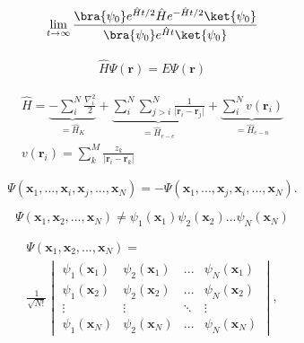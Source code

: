 \begin{equation}

\lim_{t\to\infty} \frac{\bra{\psi_0} e^{\hat{H}t/2} \hat{H} e^{-\hat{H}t/2} \ket{\psi_0}}{\bra{\psi_0} e^{\hat{H}t} \ket{\psi_0}}
\end{equation}

\begin{gather}

\hat{H} \Psi(\mathbf{r}) = E \Psi(\mathbf{r})
\end{gather}

\begin{gather}

\hat{H} = 
\underbrace{- \sum_i^N \frac{\nabla_i^2}{2}}_{=\hat{H}_K} 
+ \underbrace{\sum_i^N \sum_{j>i}^N \frac{1}{\vert\mathbf{r}_i-\mathbf{r}_j\vert}}_{=\hat{H}_{e-e}}
+ \underbrace{\sum_i^N v(\mathbf{r}_i)}_{=\hat{H}_{e-n}} \\
v(\mathbf{r}_i) = \sum_k^M \frac{z_k}{\vert\mathbf{r}_i-\mathbf{r}_k\vert}
\label{schroedinger_equation}
\end{gather}

\begin{equation}

\Psi(\mathbf{x}_1, ..., \mathbf{x}_i, \mathbf{x}_j, ..., \mathbf{x}_N) = 
-\Psi(\mathbf{x}_1, ..., \mathbf{x}_j, \mathbf{x}_i, ..., \mathbf{x}_N).
\end{equation}

\begin{equation}

\Psi(\mathbf{x}_1, \mathbf{x}_2, ..., \mathbf{x}_N) \neq \psi_1(\mathbf{x}_1) \psi_2(\mathbf{x}_2) ... \psi_N(\mathbf{x}_N)
\end{equation}

\begin{multline}

\Psi(\mathbf{x}_1, \mathbf{x}_2, ..., \mathbf{x}_N) =\\ 
\frac{1}{\sqrt{N!}}
\begin{vmatrix}
\psi_1(\mathbf{x}_1) & \psi_2(\mathbf{x}_1) & ... & \psi_N(\mathbf{x}_1) \\
\psi_1(\mathbf{x}_2) & \psi_2(\mathbf{x}_2) & ... & \psi_N(\mathbf{x}_2) \\
\vdots & \vdots & \ddots & \vdots \\
\psi_1(\mathbf{x}_N) & \psi_2(\mathbf{x}_N) & ... & \psi_N(\mathbf{x}_N)
\end{vmatrix},
\label{slater_determinant}
\end{multline}

